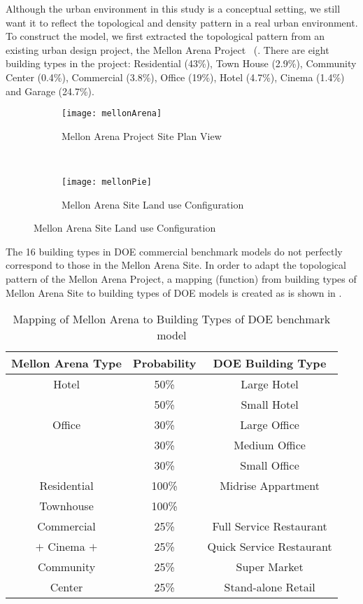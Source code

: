 Although the urban environment in this study is a conceptual setting,
we still want it to reflect the topological and density pattern in a
real urban environment. To construct the model, we first extracted the
topological pattern from an existing urban design project, the Mellon
Arena Project~\cite{baird2014} (.  There are
eight building types in the project: Residential (43\%), Town House
(2.9\%), Community Center (0.4\%), Commercial (3.8\%), Office (19\%),
Hotel (4.7\%), Cinema (1.4\%) and Garage (24.7\%).

\begin{figure}[h!]
  \centering
  \begin{subfigure}{0.5\textwidth}
  \centering
  \texttt{[image: mellonArena]}
  \caption[Mellon Arena Site Plan]{Mellon Arena Project Site Plan View}
  \label{fig:mellonArena}
\end{subfigure}
~
\begin{subfigure}{0.3\textwidth}
  \centering
  \texttt{[image: mellonPie]}
  \caption[Mellon Arena Site Land Use]{Mellon Arena Site Land use Configuration}
  \label{fig:mellonPie}
\end{subfigure}
\end{figure}
The 16 building types in DOE commercial benchmark models do not
perfectly correspond to those in the Mellon Arena Site. In order to
adapt the topological pattern of the Mellon Arena Project, a mapping
(function) from building types of Mellon Arena Site to building types
of DOE models is created as is shown in .
\begin{table}[h!]
  \centering
  \begin{tabular}{c| c| c}
    \hline
    Mellon Arena Type &Probability &DOE Building Type\\
    \hline
    \hline
    Hotel &50\%&Large Hotel\\
    \cline{2-3}
    &50\%&Small Hotel\\
    \hline
    Office &30\%&Large Office\\
    \cline{2-3}
    &30\%&Medium Office\\
    \cline{2-3}
    &30\%&Small Office\\
    \hline
    Residential &100\%&Midrise Appartment\\
    \cline{1-2}
    Townhouse &100\%&\\
    \hline
    Commercial &25\%&Full Service Restaurant\\
    \cline{2-3}
    $+$ Cinema $+$&25\%&Quick Service Restaurant\\
    \cline{2-3}
    Community &25\%&Super Market\\
    \cline{2-3}
    Center &25\%&Stand-alone Retail\\
    \hline
  \end{tabular}
  \caption{Mapping of Mellon Arena to Building Types of DOE benchmark model}
  \label{tab:typeMap}
\end{table}

